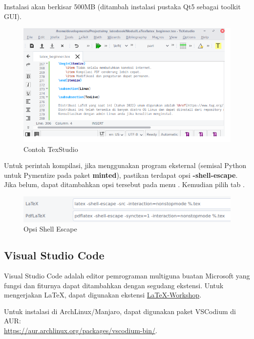 \documentclass{book} %
\begin{document}
	Instalasi akan berkisar 500MB (ditambah instalasi pustaka Qt5 sebagai toolkit GUI).

	\newpage
	\begin{figure}[!ht]
		\centering
		\includegraphics[width=400pt]{images/texstudio}
		\caption{Contoh TexStudio}
	\end{figure}

	Untuk perintah kompilasi, jika menggunakan program eksternal (semisal Python untuk Pymentize pada paket \textbf{minted}),
	pastikan terdapat opsi \textbf{-shell-escape}.
	Jika belum, dapat ditambahkan opsi tersebut pada menu .
	Kemudian pilih tab .

	\begin{figure}[!ht]
		\centering
		\includegraphics[width=400pt]{images/texstudio_shellescape}
		\caption{Opsi Shell Escape}
	\end{figure}

	\subsection{Visual Studio Code}

	Visual Studio Code adalah editor pemrograman multiguna buatan Microsoft yang fungsi dan fiturnya dapat ditambahkan dengan segudang ekstensi.
	Untuk mengerjakan \LaTeX{}, dapat digunakan ekstensi \href{https://github.com/James-Yu/LaTeX-Workshop}{LaTeX-Workshop}.

	Untuk instalasi di ArchLinux/Manjaro, dapat digunakan paket VSCodium di AUR:\\
	\url{https://aur.archlinux.org/packages/vscodium-bin/}.
\end{document}
